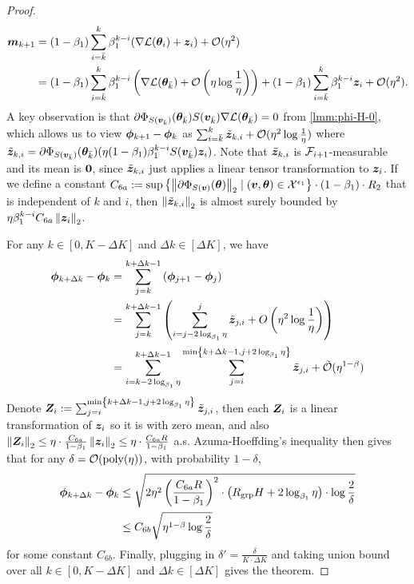 \begin{proof}
\begin{align*}
        {\bm{m}}_{k+1} &= (1-\beta_1)\sum_{i=\bar{k}}^{k}\beta_1^{k-i}(\nabla\mathcal{L}({\bm{\theta}}_i) + {\bm{z}}_i) + \mathcal{O}(\eta^2) \\
        &= (1-\beta_1)\sum_{i=\bar{k}}^{k}\beta_1^{k-i}\left(\nabla\mathcal{L}({\bm{\theta}}_{\bar{k}}) + \mathcal{O}\left(\eta\log\frac{1}{\eta}\right)\right) + (1-\beta_1)\sum_{i=\bar{k}}^{k}\beta_1^{k-i}{\bm{z}}_i + \mathcal{O}(\eta^2).
    \end{align*}
    A key observation is that $\partial\Phi_{S({\bm{v}}_{\bar{k}})}({\bm{\theta}}_{\bar{k}})S({\bm{v}}_{\bar{k}})\nabla\mathcal{L}({\bm{\theta}}_{\bar{k}}) = 0$ from \cref{lmm:phi-H-0}, which allows us to view ${\bm{\phi}}_{k+1} - {\bm{\phi}}_{k}$ as $\sum_{i=\bar{k}}^{k}\tilde{{\bm{z}}}_{k,i} + \mathcal{O}(\eta^2\log\frac{1}{\eta})$ where $\tilde{{\bm{z}}}_{k,i} = \partial\Phi_{S({\bm{v}}_{\bar{k}})}({\bm{\theta}}_{\bar{k}})(\eta(1-\beta_1)\beta_1^{k-i} S({\bm{v}}_{\bar{k}}){\bm{z}}_i)$. Note that $\tilde{{\bm{z}}}_{k,i}$ is $\mathcal{F}_{i+1}$-measurable and its mean is $\bf{0}$, since $\tilde{{\bm{z}}}_{k,i}$ just applies a linear tensor transformation to ${\bm{z}}_i$. If we define a constant $C_{6a}:=\sup\left\{\left\|\partial\Phi_{S({\bm{v}})}({\bm{\theta}})\right\|_2 \mid ({\bm{v}}, {\bm{\theta}}) \in \mathcal{X}^{\epsilon_1}\right\} \cdot (1-\beta_1) \cdot R_2$ that is independent of $k$ and $i$, then $\left\|\tilde{{\bm{z}}}_{k,i}\right\|_2$ is almost surely bounded by $\eta\beta_1^{k-i}C_{6a}\left\|{\bm{z}}_i\right\|_2$.

    For any $k \in [0, K - \Delta K]$ and $\Delta k \in [\Delta K]$, we have \begin{align*}
        {\bm{\phi}}_{k+\Delta k} - {\bm{\phi}}_k &= \sum_{j=k}^{k+\Delta k-1} \left({\bm{\phi}}_{j+1} - {\bm{\phi}}_{j}\right) \\
        &= \sum_{j=k}^{k+\Delta k-1} \left(\sum_{i=j-2\log_{\beta_1}\eta}^{j}\tilde{{\bm{z}}}_{j,i}+O\left(\eta^2 \log\frac{1}{\eta}\right)\right) \\
        &= \sum_{i=k-2\log_{\beta_1}\eta}^{k+\Delta k - 1}\sum_{j=i}^{\min\left\{k+\Delta k - 1, j +2\log_{\beta_1}\eta\right\}} \tilde{{\bm{z}}}_{j,i} + \tilde{\mathcal{O}}(\eta^{1-\beta})
    \end{align*}
    Denote ${\bm{Z}}_i := \sum_{j=i}^{\min\left\{k+\Delta k - 1, j +2\log_{\beta_1}\eta\right\}} \tilde{{\bm{z}}}_{j,i}$, then each ${\bm{Z}}_i$ is a linear transformation of ${\bm{z}}_i$ so it is with zero mean, and also $\left\|{\bm{Z}}_i\right\|_2 \leq \eta \cdot \frac{C_{6a}}{1-\beta_1} \left\|{\bm{z}}_i\right\|_2 \leq \eta \cdot \frac{C_{6a}R}{1-\beta_1}$ a.s. Azuma-Hoeffding's inequality then gives that for any $\delta = \mathcal{O}(\mathrm{poly}(\eta))$, with probability $1 - \delta$, \begin{align*}
        {\bm{\phi}}_{k + \Delta k} - {\bm{\phi}}_{k} &\leq \sqrt{2 \eta^2 \left(\frac{C_{6a}R}{1-\beta_1}\right)^2 \cdot \left(R_{\mathrm{grp}}H + 2\log_{\beta_1}\eta\right) \cdot \log\frac{2}{\delta}} \\
        &\leq C_{6b} \sqrt{\eta^{1-\beta}\log\frac{2}{\delta}}
    \end{align*} 
    for some constant $C_{6b}$. Finally, plugging in $\delta' = \frac{\delta}{K \cdot \Delta K}$ and taking union bound over all $k \in [0, K - \Delta K]$ and $\Delta k \in [\Delta K]$ gives the theorem.
\end{proof}


